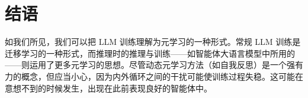\section{结语}
如我们所见，我们可以把 LLM 训练理解为元学习的一种形式。常规 LLM 训练是迁移学习的一种形式，而推理时的推理与训练——如智能体大语言模型中所用的——则运用了更多元学习的思想。尽管动态元学习方法（如自我反思）是一个强有力的概念，但应当小心，因为内外循环之间的干扰可能使训练过程失稳。这可能在意想不到的时候发生，出现在此前表现良好的智能体中。


